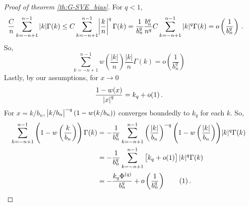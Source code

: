 \documentclass[11pt]{article}
\newcommand\numberthis{\addtocounter{equation}{1}\tag{\theequation}}
\theoremstyle{remark}
\begin{document}
\begin{proof}[Proof of theorem \ref{th:G-SVE_bias}]
For $q <1$,
\begin{align*}
   \dfrac{C}{n}\sum_{k = -n+1}^{n-1}|k|  \Gamma(k)  &\leq C\sum_{k =-n+1}^{n-1}\abs{\dfrac{k}{n}}^q  \Gamma(k)  = \dfrac{1}{b_n^q}\dfrac{b_n^q}{n^q} C \sum_{k =-n+1}^{n-1}|k|^q \Gamma(k)  = o\left(\dfrac{1}{b_n^q}\right) \, .
\end{align*}
So,
\begin{equation}
\label{eq:P1_second}
 \sum_{k = -n+1}^{n-1}w\left(\dfrac{|k|}{n}\right)\dfrac{|k|}{n}\Gamma(k) = o \left(\dfrac{1}{b_n^q} \right)
\end{equation}
Lastly, by our assumptions, for $x \to 0$
\[
\dfrac{1 - w(x)}{\abs{x}^q} = k_q + o(1)\,.
\]
For $x = k/b_n$, $\abs{k/b_n}^{-q}(1-w(k/b_n))$ converges boundedly to $k_q$ for each $k$.
So,
\begin{align*}
     \sum_{k = -n+1}^{n-1}\left(1-w\left(\dfrac{k}{b_n}\right)\right)\Gamma(k) &= -\dfrac{1}{b_n^q}\sum_{k = -n+1}^{n-1}  \left(\dfrac{|k|}{b_n}\right)^{-q} {\left(1-w\left(\dfrac{|k|}{b_n}\right)\right)}|k|^q \Gamma(k) \\
     & = -\dfrac{1}{b_n^q}\sum_{k = -n+1}^{n-1}   \left[k_q + o(1) \right]|k|^q \Gamma(k) \\
     & = -\dfrac{k_q \Phi^{(q)} }{b_n^q} + o\left( \dfrac{1}{b_n^q} \right) \numberthis \label{eq:P1_third}\,.
\end{align*}
%

\end{proof}
\end{document}
